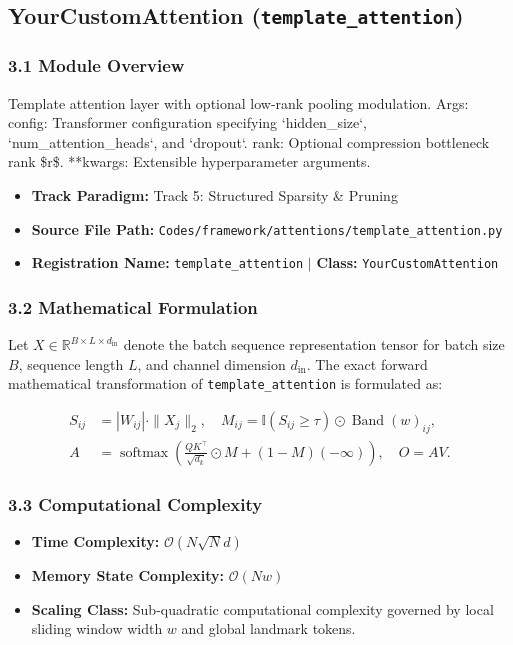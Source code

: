 \subsection{YourCustomAttention (\texttt{template\_attention})}
\label{sec:app_module_template_attention}

\subsubsection*{3.1 Module Overview}
Template attention layer with optional low-rank pooling modulation.  Args:     config: Transformer configuration specifying `hidden\_size`, `num\_attention\_heads`, and `dropout`.     rank: Optional compression bottleneck rank \$r\$.     **kwargs: Extensible hyperparameter arguments.
\begin{itemize}
    \item \textbf{Track Paradigm:} Track 5: Structured Sparsity & Pruning
    \item \textbf{Source File Path:} \texttt{Codes/framework/attentions/template\_attention.py}
    \item \textbf{Registration Name:} \texttt{template\_attention} $\mid$ \textbf{Class:} \texttt{YourCustomAttention}
\end{itemize}

\subsubsection*{3.2 Mathematical Formulation}
Let $X \in \mathbb{R}^{B \times L \times d_{\text{in}}}$ denote the batch sequence representation tensor for batch size $B$, sequence length $L$, and channel dimension $d_{\text{in}}$. The exact forward mathematical transformation of \texttt{template\_attention} is formulated as:

\begin{align}
S_{ij} &= |W_{ij}| \cdot \|X_j\|_2, \quad M_{ij} = \mathbb{I}(S_{ij} \ge \tau) \odot \operatorname{Band}(w)_{ij}, \\
A &= \operatorname{softmax}\left(\frac{Q K^\top}{\sqrt{d_k}} \odot M + (1 - M)(-\infty)\right), \quad O = A V.
\end{align}


\subsubsection*{3.3 Computational Complexity}
\begin{itemize}
    \item \textbf{Time Complexity:} $\mathcal{O}(N \sqrt{N} d)$
    \item \textbf{Memory State Complexity:} $\mathcal{O}(N w)$
    \item \textbf{Scaling Class:} Sub-quadratic computational complexity governed by local sliding window width $w$ and global landmark tokens.
\end{itemize}

